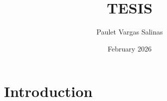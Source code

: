 \documentclass{article}
\title{TESIS}
\author{Paulet Vargas Salinas}
\date{February 2026}
\begin{document}
\maketitle

\section{Introduction}
\end{document}
